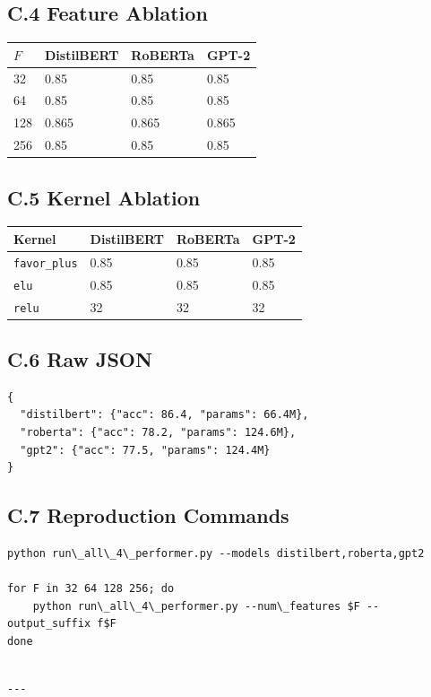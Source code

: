 \subsection{C.4 Feature Ablation}

\begin{table}[H]
\centering
\small
\begin{tabular}{llll}
\toprule
\textbf{$F$} & \textbf{DistilBERT} & \textbf{RoBERTa} & \textbf{GPT-2} \\
\midrule
32 & 0.85 & 0.85 & 0.85 \\
64 & 0.85 & 0.85 & 0.85 \\
128 & 0.865 & 0.865 & 0.865 \\
256 & 0.85 & 0.85 & 0.85 \\
\bottomrule
\end{tabular}
\end{table}

\subsection{C.5 Kernel Ablation}

\begin{table}[H]
\centering
\small
\begin{tabular}{llll}
\toprule
\textbf{Kernel} & \textbf{DistilBERT} & \textbf{RoBERTa} & \textbf{GPT-2} \\
\midrule
\texttt{favor\_plus} & 0.85 & 0.85 & 0.85 \\
\texttt{elu} & 0.85 & 0.85 & 0.85 \\
\texttt{relu} & 32 & 32 & 32 \\
\bottomrule
\end{tabular}
\end{table}

\subsection{C.6 Raw JSON}

\begin{lstlisting}
{
  "distilbert": {"acc": 86.4, "params": 66.4M},
  "roberta": {"acc": 78.2, "params": 124.6M},
  "gpt2": {"acc": 77.5, "params": 124.4M}
}
\end{lstlisting}

\subsection{C.7 Reproduction Commands}

\begin{lstlisting}
python run\_all\_4\_performer.py --models distilbert,roberta,gpt2

for F in 32 64 128 256; do
    python run\_all\_4\_performer.py --num\_features $F --output_suffix f$F
done
\end{lstlisting}
\begin{lstlisting}

---
\end{lstlisting}